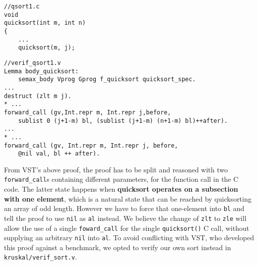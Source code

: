 \begin{lstlisting}
//qsort1.c
void
quicksort(int m, int n)
{
	...
	quicksort(m, j);
\end{lstlisting}
\begin{lstlisting}
//verif_qsort1.v
Lemma body_quicksort:
	semax_body Vprog Gprog f_quicksort quicksort_spec.
...
destruct (zlt m j).
* ...
forward_call (gv,Int.repr m, Int.repr j,before,
	sublist 0 (j+1-m) bl, (sublist (j+1-m) (n+1-m) bl)++after).
...
* ...
forward_call (gv, Int.repr m, Int.repr j, before,
	@nil val, bl ++ after).
\end{lstlisting}

From VST's above proof, the proof has to be split and reasoned with two \texttt{forward\_call}s containing different parameters, for the function call in the C code. The latter state happens when \textbf{quicksort operates on a subsection with one element}, which is a natural state that can be reached by quicksorting an array of odd length. However we have to force that one-element into \texttt{bl} and tell the proof to use \texttt{nil} as \texttt{al} instead. We believe the change of \texttt{zlt} to \texttt{zle} will allow the use of a single \texttt{foward\_call} for the single \texttt{quicksort()} C call, without supplying an arbitrary \texttt{nil} into \texttt{al}. To avoid conflicting with VST, who developed this proof against a benchmark, we opted to verify our own sort instead in \texttt{kruskal/verif\_sort.v}.
